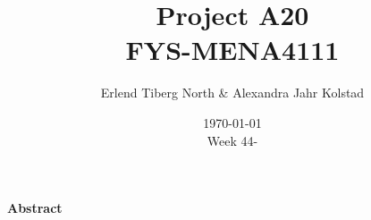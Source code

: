 \documentclass{article}
\begin{document}
\addtocounter{page}{0}

\title{Project A20 \\
      \large FYS-MENA4111}
\date{\today \\
    \vspace{1mm}
    \large Week 44-}

\author{Erlend Tiberg North \& Alexandra Jahr Kolstad}

\maketitle






\vspace{1cm}


\begin{center}

{\Large\textbf{Abstract}} \label{sec:Abstract} \\

    \vspace{1cm}

\end{center}


\newpage

\vspace{1cm}

\tableofcontents

\vspace{1cm}

\end{document}
